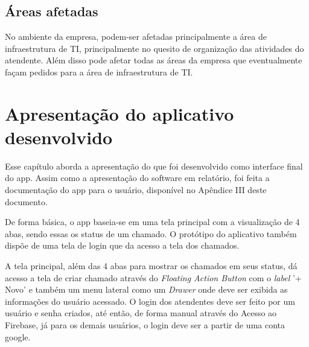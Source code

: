 \subsection{Áreas afetadas}
No ambiente da empresa, podem-ser afetadas principalmente a área de infraestrutura de TI, principalmente no quesito de organização das atividades do atendente. Além disso pode afetar todas as áreas da empresa que eventualmente façam pedidos para a área de infraestrutura de TI.

\section{Apresentação do aplicativo desenvolvido}
Esse capítulo aborda a apresentação do que foi desenvolvido como interface final do app. Assim como a apresentação do software em relatório, foi feita a documentação do app para o usuário, disponível no Apêndice III deste documento. 

De forma básica, o app baseia-se em uma tela principal com a visualização de 4 abas, sendo essas os status de um chamado. O protótipo do aplicativo também dispõe de uma tela de login que da acesso a tela dos chamados. 

A tela principal, além das 4 abas para mostrar os chamados em seus status, dá acesso a tela de criar chamado através do \textit{Floating Action Button} com o \textit{label} '+ Novo' e também um menu lateral como um \textit{Drawer} onde deve ser exibida as informações do usuário acessado. O login dos atendentes deve ser feito por um usuário e senha criados, até então, de forma manual através do Acesso ao Firebase, já para os demais usuários, o login deve ser a partir de uma conta google.


